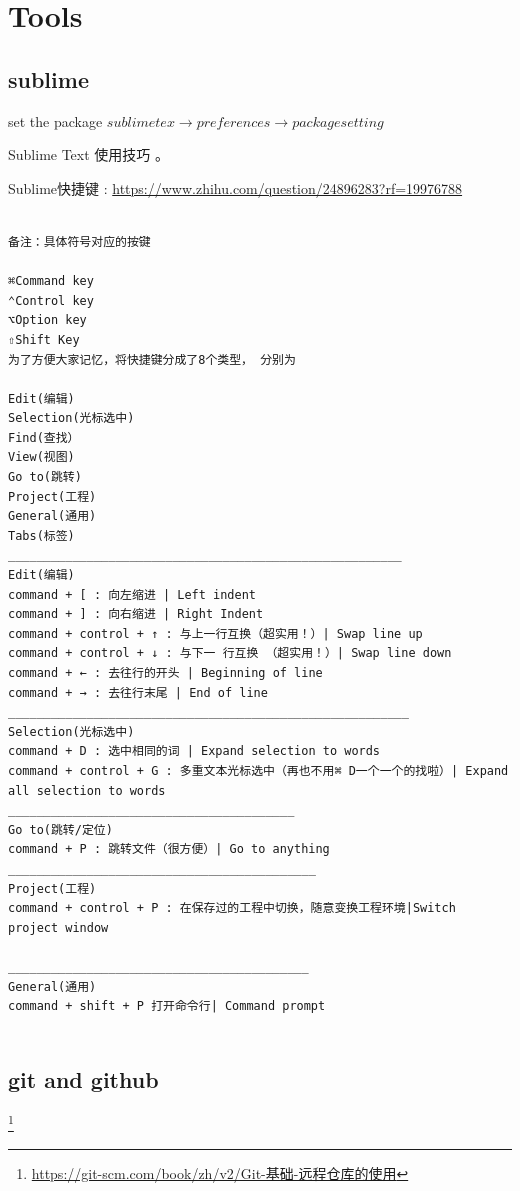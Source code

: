 
\chapter{Tools}
\section{sublime}

set the package $sublime tex \rightarrow preferences \rightarrow package setting$

Sublime Text 使用技巧
。

Sublime快捷键 : \url{https://www.zhihu.com/question/24896283?rf=19976788}

\begin{verbatim}

备注：具体符号对应的按键

⌘Command key
⌃Control key
⌥Option key
⇧Shift Key
为了方便大家记忆，将快捷键分成了8个类型， 分别为

Edit(编辑)
Selection(光标选中)
Find(查找）
View(视图)
Go to(跳转)
Project(工程)
General(通用)
Tabs(标签)
_______________________________________________________
Edit(编辑)
command + [ : 向左缩进 | Left indent
command + ] : 向右缩进 | Right Indent
command + control + ↑ : 与上一行互换（超实用！）| Swap line up
command + control + ↓ : 与下一￼行互换￼（超实用！）| Swap line down
command + ← : 去往行的开头 | Beginning of line
command + → : 去往行末尾 | End of line
________________________________________________________
Selection(光标选中)
command + D : 选中相同的词 | Expand selection to words
command + control + G : 多重文本光标选中（再也不用⌘ D一个一个的找啦）| Expand all selection to words
________________________________________
Go to(跳转/定位)
command + P : 跳转文件（很方便）| Go to anything
___________________________________________
Project(工程)
command + control + P : 在保存过的工程中切换，随意变换工程环境|Switch project window

__________________________________________
General(通用)
command + shift + P 打开命令行| Command prompt


\end{verbatim}




\section{git and github}\footnote{\url{https://git-scm.com/book/zh/v2/Git-基础-远程仓库的使用}}

